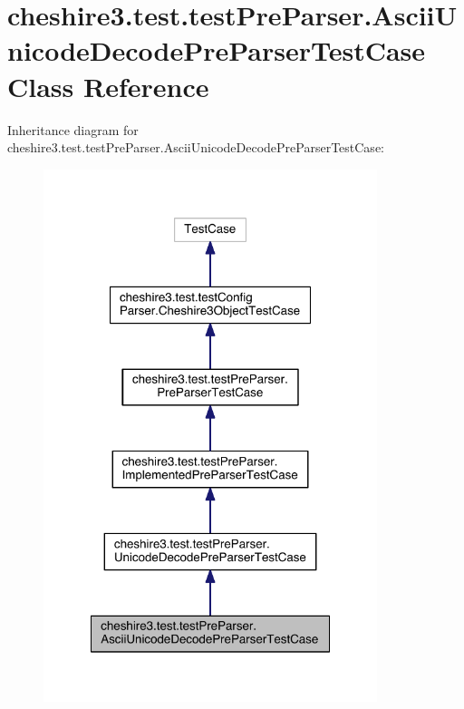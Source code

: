 \hypertarget{classcheshire3_1_1test_1_1test_pre_parser_1_1_ascii_unicode_decode_pre_parser_test_case}{\section{cheshire3.\-test.\-test\-Pre\-Parser.\-Ascii\-Unicode\-Decode\-Pre\-Parser\-Test\-Case Class Reference}
\label{classcheshire3_1_1test_1_1test_pre_parser_1_1_ascii_unicode_decode_pre_parser_test_case}
}


Inheritance diagram for cheshire3.\-test.\-test\-Pre\-Parser.\-Ascii\-Unicode\-Decode\-Pre\-Parser\-Test\-Case\-:
\nopagebreak
\begin{figure}[H]
\begin{center}
\leavevmode
\includegraphics[width=276pt]{classcheshire3_1_1test_1_1test_pre_parser_1_1_ascii_unicode_decode_pre_parser_test_case__inherit__graph}
\end{center}
\end{figure}


